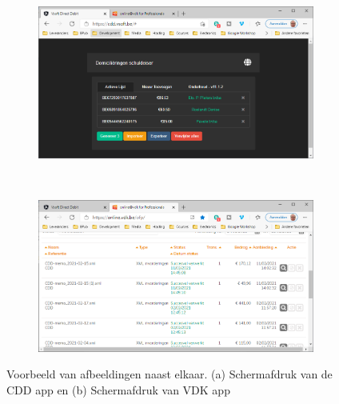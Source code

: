 \documentclass[11pt, a4paper]{article}
\begin{document}
  \begin{figure}
  	\centering
  	\begin{subfigure}[b]{0.45\linewidth}
		  \centering
		  \includegraphics[width=\linewidth]{cddscreen}
		  \caption{}
		  \label{fig:cdd}
	  \end{subfigure}
	  ~
	  \begin{subfigure}[b]{0.45\linewidth}
  		\centering
		  \includegraphics[width=\linewidth]{vdkscreen}
		  \caption{}
		  \label{fig:vdk}
	  \end{subfigure}
	  \caption{
      Voorbeeld van afbeeldingen naast elkaar. (a) Schermafdruk van de CDD
      app en (b) Schermafdruk van VDK app}
	  \label{fig:subfigs cap}
  \end{figure}

\end{document}
